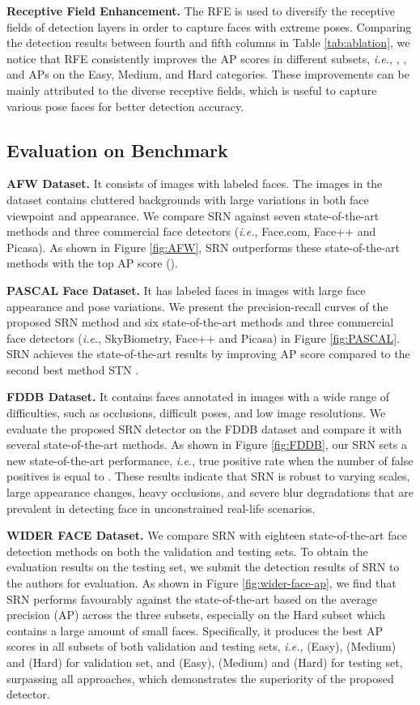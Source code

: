 \documentclass[letterpaper]{article} \usepackage{aaai19m}  \usepackage{times}  \usepackage{helvet}  \usepackage{courier}  \usepackage{url}  \usepackage{graphicx}  \usepackage{subfigure}
\def\ie{{\em i.e.}}
\begin{document}
{\flushleft \textbf{Receptive Field Enhancement.} }
The RFE is used to diversify the receptive fields of detection layers in order to capture faces with extreme poses. Comparing the detection results between fourth and fifth columns in Table \ref{tab:ablation}, we notice that  RFE consistently improves the AP scores in different subsets, \ie, , , and  APs on the Easy, Medium, and Hard categories. These improvements can be mainly attributed to the diverse receptive fields, which is useful to capture various pose faces for better detection accuracy. 




\subsection{Evaluation on Benchmark}
{\flushleft \textbf{AFW Dataset.} }
It consists of  images with  labeled faces. The images in the dataset contains cluttered backgrounds with large variations in both face viewpoint and appearance. We compare SRN against seven state-of-the-art methods and three commercial face detectors (\ie, Face.com, Face++ and Picasa). As shown in Figure \ref{fig:AFW}, SRN outperforms these state-of-the-art methods with the top AP score ().

{\flushleft \textbf{PASCAL Face Dataset.} }
It has  labeled faces in  images with large face appearance and pose variations. We present the precision-recall curves of the proposed SRN method and six state-of-the-art methods and three commercial face detectors (\ie, SkyBiometry, Face++ and Picasa) in Figure \ref{fig:PASCAL}. SRN achieves the state-of-the-art results by improving  AP score compared to the second best method STN \cite{DBLP:conf/eccv/ChenHW016}.

{\flushleft \textbf{FDDB Dataset.} }
It contains  faces annotated in  images with a wide range of difficulties, such as occlusions, difficult poses, and low image resolutions. We evaluate the proposed SRN detector on the FDDB dataset and compare it with several state-of-the-art methods. As shown in Figure \ref{fig:FDDB}, our SRN sets a new state-of-the-art performance, \ie,  true positive rate when the number of false positives is equal to . These results indicate that SRN is robust to varying scales, large appearance changes, heavy occlusions, and severe blur degradations that are prevalent in detecting face in unconstrained real-life scenarios.


{\flushleft \textbf{WIDER FACE Dataset.} }
We compare SRN with eighteen state-of-the-art face detection methods on both the validation and testing sets. To obtain the evaluation results on the testing set, we submit the detection results of SRN to the authors for evaluation. As shown in Figure \ref{fig:wider-face-ap}, we find that SRN performs favourably against the state-of-the-art based on the average precision (AP) across the three subsets, especially on the Hard subset which contains a large amount of small faces. Specifically, it produces the best AP scores in all subsets of both validation and testing sets, \ie,  (Easy),  (Medium) and  (Hard) for validation set, and  (Easy),  (Medium) and  (Hard) for testing set, surpassing all approaches, which demonstrates the superiority of the proposed detector.
\end{document}
